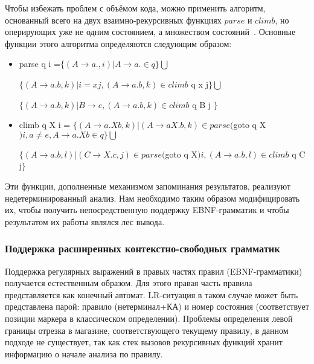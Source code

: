 Чтобы избежать проблем с объёмом кода, можно применить алгоритм, основанный всего на двух взаимно-рекурсивных функциях $parse$ и $climb$,  но оперирующих уже не одним состоянием, а множеством состояний~\cite{RecursiveAscentParsing}. Основные функции этого алгоритма определяются следующим образом:
\begin{itemize}
	\item parse  q i =$\{(A\stackrel{}{\rightarrow}a. , i) | A\stackrel{}{\rightarrow} a. \in q\}\bigcup$
  
  \hspace{1,9cm}       $\{(A\stackrel{}{\rightarrow}a.b , k) | i = xj ,(A\stackrel{}{\rightarrow}a.b, k) \in climb$ q x j$  \}
  \bigcup$
  
  \hspace{1,9cm}       $\{(A\stackrel{}{\rightarrow}a.b , k) | B\stackrel{}{\rightarrow}e , (A\stackrel{}{\rightarrow}a.b, k) \in climb$ q B j $\}$
  \item climb q X  i = $\{(A\stackrel{}{\rightarrow}a.Xb , k) | (A\stackrel{}{\rightarrow}aX.b, k)\in parse($goto q X$) i , a\neq e, A\stackrel{}{\rightarrow}a.Xb \in q\}\bigcup$
  
  \hspace{2,5cm}          $\{(A\stackrel{}{\rightarrow}a.b , l) | (C\stackrel{}{\rightarrow}X.c,j)\in parse($goto q X$) i, (A\stackrel{}{\rightarrow}a.b ,l)\in climb$ q C j$\} $
\end{itemize}

Эти функции, дополненные механизмом запоминания результатов, реализуют недетерминированный анализ. Нам необходимо таким образом модифицировать их, чтобы получить непосредственную поддержку EBNF-грамматик и чтобы результатом их работы являлся лес вывода.



\subsubsection{Поддержка расширенных контекстно-свободных грамматик}

Поддержка регулярных выражений в правых частях правил (EBNF-грамматики) получается естественным образом. Для этого правая часть правила представляется как конечный автомат. LR-ситуация в таком случае может быть представлена парой: правило (нетерминал+КА) и номер состояния (соответствует позиции маркера в классическом определении). Проблемы определения левой границы отрезка в магазине, соответствующего текущему правилу, в данном подходе не существует, так как стек вызовов рекурсивных функций хранит информацию о начале анализа по правилу.

